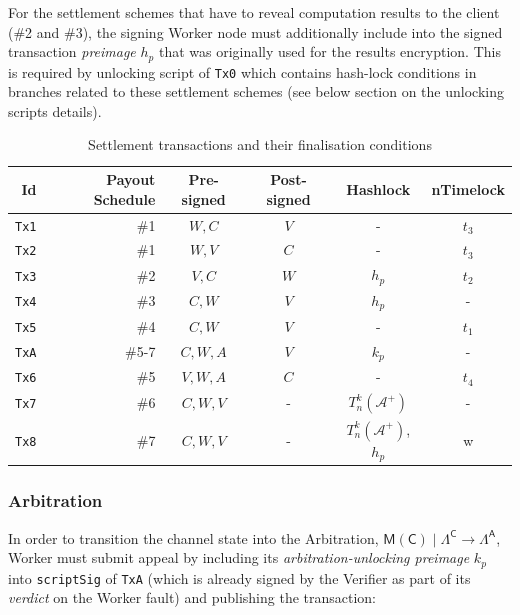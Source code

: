 \documentclass[a4paper]{article}
\begin{document}
For the settlement schemes that have to reveal computation results to the client (\#2 and \#3), the signing Worker node must additionally include into the signed transaction \textit{preimage} $h_p$ that was originally used for the results encryption. This is required by unlocking script of \texttt{Tx0} which contains hash-lock conditions in branches related to these settlement schemes (see below section on the unlocking scripts details).

\begin{table}[h!]
    \caption{Settlement transactions and their finalisation conditions}
    \label{table:tx}
    \begin{adjustbox}{center}
        \begin{tabular}{@{} r r c c c c @{}}
            \toprule
            Id & Payout Schedule & Pre-signed & Post-signed & Hashlock & nTimelock\\
            \midrule
            \texttt{Tx1} & \#1   & $W, C$ & $V$ & - & $t_3$ \\
            \texttt{Tx2} & \#1   & $W, V$ & $C$ & - & $t_3$ \\
            \texttt{Tx3} & \#2   & $V, C$ & $W$ & $h_p$ & $t_2$ \\
            \texttt{Tx4} & \#3   & $C, W$ & $V$ & $h_p$ & - \\
            \texttt{Tx5} & \#4   & $C, W$ & $V$ & - & $t_1$ \\
            \texttt{TxA} & \#5-7 & $C, W, A$ & $V$ & $k_p$ & - \\
            \texttt{Tx6} & \#5   & $V, W, A$ & $C$ & - & $t_4$ \\
            \texttt{Tx7} & \#6   & $C, W, V$ & - & $T^k_n(\mathcal{A^+})$ & - \\
            \texttt{Tx8} & \#7   & $C, W, V$ & - & $T^k_n(\mathcal{A^+})$, $h_p$ & w \\
            \bottomrule
        \end{tabular}
    \end{adjustbox}
\end{table}

\subsubsection{Arbitration}

In order to transition the channel state into the Arbitration, $\mathsf{M}(\mathsf{C}) \mid \Lambda^{\mathsf{C}} \rightarrow \Lambda^{\mathsf{A}}$, Worker must submit appeal by including its \textit{arbitration-unlocking preimage} $k_p$ into \texttt{scriptSig} of \texttt{TxA} (which is already signed by the Verifier as part of its \textit{verdict} on the Worker fault) and publishing the transaction:
\end{document}
